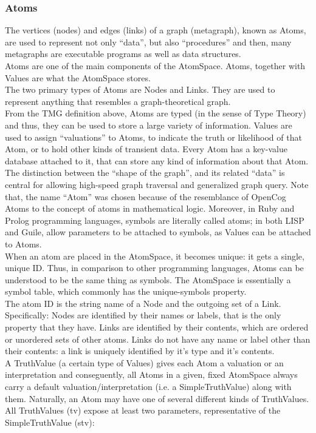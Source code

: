 \subsubsection{Atoms}\label{sec:atoms}

The vertices (nodes) and edges (links) of a graph (metagraph), known as Atoms, are used to represent not only \enquote{data}, but also \enquote{procedures} and then, many metagraphs are executable programs as well as data structures. \\
Atoms are one of the main components of the AtomSpace. Atoms, together with Values are what the AtomSpace stores.  \\
The two primary types of Atoms are Nodes and Links. They are used to represent anything that resembles a graph-theoretical graph. \\
From the TMG definition above, Atoms are typed (in the sense of Type Theory) and thus, they can be used to store a large variety of information. 
Values are used to assign \enquote{valuations} to Atoms, to indicate the truth or likelihood of that Atom, or to hold other kinds of transient data. Every Atom has a key-value database attached to it, that can store any kind of information about that Atom. The distinction between the \enquote{shape of the graph}, and its related \enquote{data} is central for allowing high-speed graph traversal and generalized graph query. Note that, the name \enquote{Atom} was chosen because of the resemblance of OpenCog Atoms to the concept of atoms in mathematical logic. Moreover, in Ruby and Prolog programming languages, symbols are literally called atoms; in both LISP and Guile, allow parameters to be attached to symbols, as Values can be attached to Atoms. \\

When an atom are placed in the AtomSpace, it becomes unique: it gets a single, unique ID. Thus, in comparison to other programming languages\footnotemark{}, Atoms can be understood to be the same thing as symbols. The AtomSpace is essentially a symbol table, which commonly has the unique-symbols property. \\
The atom ID is the string name of a Node and the outgoing set of a Link. Specifically: Nodes are identified by their names or labels, that is the only property that they have. Links are identified by their contents, which are ordered or unordered sets of other atoms. Links do not have any name or label other than their contents: a link is uniquely identified by it's type and it's contents.\\
A TruthValue (a certain type of Values) gives each Atom a valuation or an interpretation and conseguently, all Atoms in a given, fixed AtomSpace always carry a default valuation/interpretation (i.e. a SimpleTruthValue) along with them. Naturally, an Atom may have one of several different kinds of TruthValues. \\
All TruthValues (tv) expose at least two parameters, representative of the SimpleTruthValue (stv):

